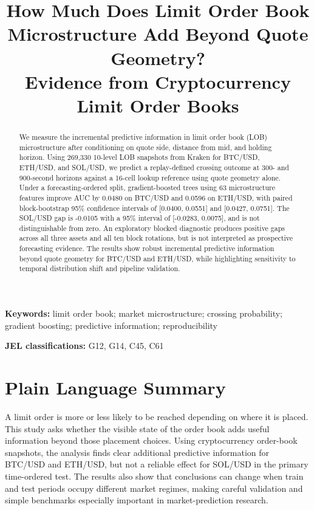 \documentclass[11pt]{article}
\title{\textbf{How Much Does Limit Order Book Microstructure Add Beyond Quote Geometry?}\\[0.35em]
\large Evidence from Cryptocurrency Limit Order Books}
\author{}
\date{}
\begin{document}
\maketitle

\begin{abstract}
We measure the incremental predictive information in limit order book (LOB) microstructure after conditioning on quote side, distance from mid, and holding horizon. Using 269,330 10-level LOB snapshots from Kraken for BTC/USD, ETH/USD, and SOL/USD, we predict a replay-defined crossing outcome at 300- and 900-second horizons against a 16-cell lookup reference using quote geometry alone. Under a forecasting-ordered split, gradient-boosted trees using 63 microstructure features improve AUC by 0.0480 on BTC/USD and 0.0596 on ETH/USD, with paired block-bootstrap 95\% confidence intervals of [0.0400, 0.0551] and [0.0427, 0.0751]. The SOL/USD gap is -0.0105 with a 95\% interval of [-0.0283, 0.0075], and is not distinguishable from zero. An exploratory blocked diagnostic produces positive gaps across all three assets and all ten block rotations, but is not interpreted as prospective forecasting evidence. The results show robust incremental predictive information beyond quote geometry for BTC/USD and ETH/USD, while highlighting sensitivity to temporal distribution shift and pipeline validation.
\end{abstract}

\noindent\textbf{Keywords:} limit order book; market microstructure; crossing probability; gradient boosting; predictive information; reproducibility

\medskip
\noindent\textbf{JEL classifications:} G12, G14, C45, C61

\section*{Plain Language Summary}
A limit order is more or less likely to be reached depending on where it is placed. This study asks whether the visible state of the order book adds useful information beyond those placement choices. Using cryptocurrency order-book snapshots, the analysis finds clear additional predictive information for BTC/USD and ETH/USD, but not a reliable effect for SOL/USD in the primary time-ordered test. The results also show that conclusions can change when train and test periods occupy different market regimes, making careful validation and simple benchmarks especially important in market-prediction research.
\end{document}
